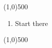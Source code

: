


\fontsize{20}{24}
\line(1,0){500}
\fontsize{12}{15}
\begin{enumerate}
\item Start there
\end{enumerate}
\line(1,0){500}
\vfill \hfill {}
